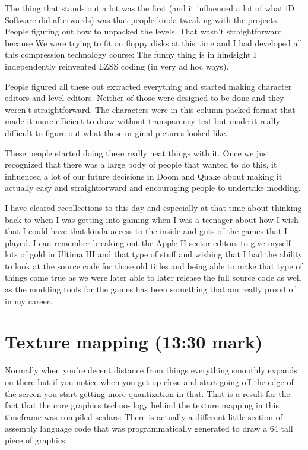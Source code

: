 \documentclass[book.tex]{subfiles}
\begin{document}
The thing that stands out a lot was the first (and it influenced a lot
of what iD Software did afterwards) was that people kinda tweaking with
the projects. People figuring out how to unpacked the levels. That 
wasn't straightforward because We were trying to fit on floppy disks 
at this time and I had developed all this compression technology course:
The funny thing is in hindsight I independently reinvented LZSS coding 
(in very ad hoc ways). \\
\par
People figured all these out extracted everything and started making 
character editors and  level editors. Neither of those were designed 
to be done and they weren't straightforward. The characters were in 
this column packed format that made it more efficient to draw without 
transparency test but made it really difficult to figure out what 
these original pictures looked like. \\
\par
These people started doing these really neat things with it. Once we 
just recognized that there was a large body of people that wanted to 
do this, it influenced a lot of our future decisions in Doom and Quake 
about making it actually easy and straightforward and encouraging 
people to undertake modding.\\
\par
I have cleared recollections to this day and especially at that time 
about thinking back to when I was getting into gaming when I was a 
teenager about how I wish that I could have that kinda access to the 
inside and guts of the games that I played. I can remember breaking 
out the Apple II sector editors to give myself lots of gold in 
Ultima III and that type of stuff and wishing that I had the ability 
to look at the source code for those old titles and being able to 
make that type of things come true as we were later able to later 
release  the full source code as well as the modding tools for the 
games has been something that am really proud of in my career.\\




\section{Texture mapping (13:30 mark)}


Normally when you're decent distance from things everything smoothly 
expands on there but if you notice when you get up close and start 
going off the edge of the screen you start getting more quantization 
in that. That is a result for the fact that the core graphics techno-
logy behind the texture mapping in this timeframe was compiled 
scalars: There is actually a different little section of assembly 
language code that was programmatically generated to draw a 64 tall 
piece of graphics:\\
\end{document}
